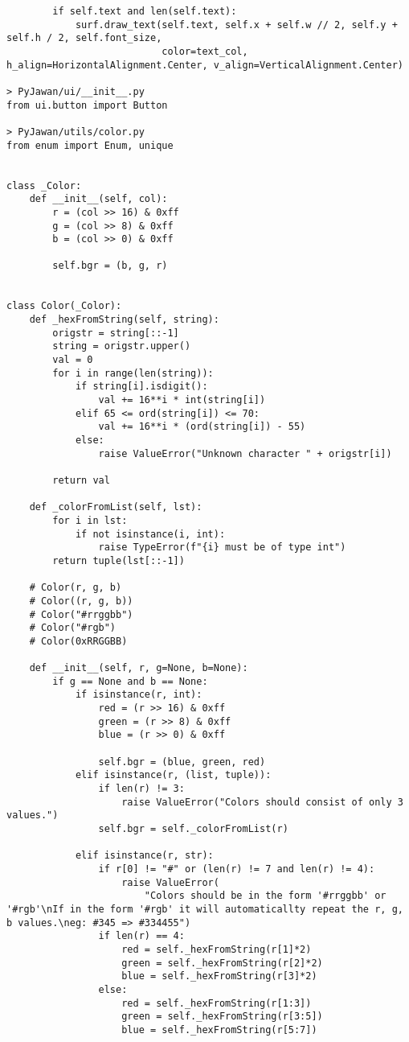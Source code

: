 \documentclass[11pt]{article}
\begin{document}
\begin{lstlisting}
        if self.text and len(self.text):
            surf.draw_text(self.text, self.x + self.w // 2, self.y + self.h / 2, self.font_size,
                           color=text_col, h_align=HorizontalAlignment.Center, v_align=VerticalAlignment.Center)

> PyJawan/ui/__init__.py
from ui.button import Button

> PyJawan/utils/color.py
from enum import Enum, unique


class _Color:
    def __init__(self, col):
        r = (col >> 16) & 0xff
        g = (col >> 8) & 0xff
        b = (col >> 0) & 0xff

        self.bgr = (b, g, r)


class Color(_Color):
    def _hexFromString(self, string):
        origstr = string[::-1]
        string = origstr.upper()
        val = 0
        for i in range(len(string)):
            if string[i].isdigit():
                val += 16**i * int(string[i])
            elif 65 <= ord(string[i]) <= 70:
                val += 16**i * (ord(string[i]) - 55)
            else:
                raise ValueError("Unknown character " + origstr[i])

        return val

    def _colorFromList(self, lst):
        for i in lst:
            if not isinstance(i, int):
                raise TypeError(f"{i} must be of type int")
        return tuple(lst[::-1])

    # Color(r, g, b)
    # Color((r, g, b))
    # Color("#rrggbb")
    # Color("#rgb")
    # Color(0xRRGGBB)

    def __init__(self, r, g=None, b=None):
        if g == None and b == None:
            if isinstance(r, int):
                red = (r >> 16) & 0xff
                green = (r >> 8) & 0xff
                blue = (r >> 0) & 0xff

                self.bgr = (blue, green, red)
            elif isinstance(r, (list, tuple)):
                if len(r) != 3:
                    raise ValueError("Colors should consist of only 3 values.")
                self.bgr = self._colorFromList(r)

            elif isinstance(r, str):
                if r[0] != "#" or (len(r) != 7 and len(r) != 4):
                    raise ValueError(
                        "Colors should be in the form '#rrggbb' or '#rgb'\nIf in the form '#rgb' it will automaticallty repeat the r, g, b values.\neg: #345 => #334455")
                if len(r) == 4:
                    red = self._hexFromString(r[1]*2)
                    green = self._hexFromString(r[2]*2)
                    blue = self._hexFromString(r[3]*2)
                else:
                    red = self._hexFromString(r[1:3])
                    green = self._hexFromString(r[3:5])
                    blue = self._hexFromString(r[5:7])


\end{lstlisting}
\end{document}

